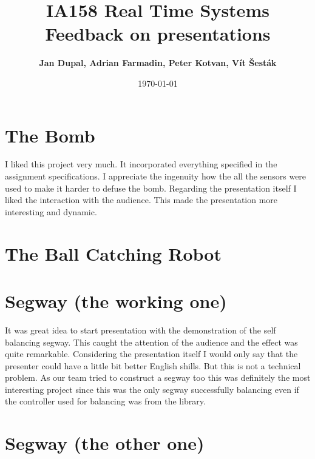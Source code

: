 \documentclass{article}
\title{
\textmd{IA158 Real Time Systems}\\
\textmd{\textbf{Feedback on presentations}}
}
\author{\textbf{Jan Dupal, Adrian Farmadin, Peter Kotvan, Vít Šesták}}
\date{\today} %
\begin{document}
\maketitle

\section*{The Bomb}

I liked this project very much. It incorporated everything specified in the
assignment specifications. I appreciate the ingenuity how the all the sensors
were used to make it harder to defuse the bomb. Regarding the presentation
itself I liked the interaction with the audience. This made the presentation
more interesting and dynamic.

\section*{The Ball Catching Robot}


\section*{Segway (the working one)} 

It was great idea to start presentation with the demonstration of the self
balancing segway. This caught the attention of the audience and the effect was
quite remarkable. Considering the presentation itself I would only say that the
presenter could have a little bit better English shills. But this is not a
technical problem. As our team tried to construct a segway too this was
definitely the most interesting project since this was the only segway
successfully balancing even if the controller used for balancing was from the
library.

\section*{Segway (the other one)}
\end{document}
